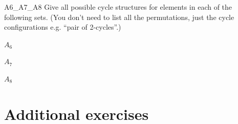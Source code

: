 \begin{exercise}{A6_A7_A8}
Give all possible cycle structures for elements in each of the following sets. (You don't need to list all the permutations, just the cycle configurations e.g. ``pair of 2-cycles''.)
\begin{enumerate}[(a)]
\begin{multicols}{3}
\item
$A_6$
\item
$A_7$
\item
$A_8$
\end{multicols}
\end{enumerate}
\end{exercise}


\section{Additional exercises}
\label{sec:Permutation:AdditionalExercises}
 
